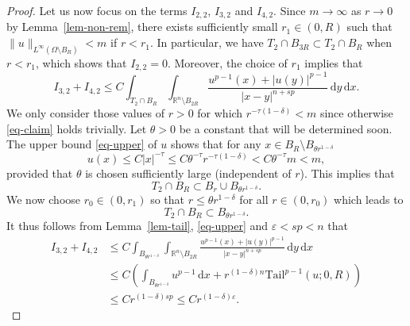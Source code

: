 \documentclass[11pt]{amsart}
\theoremstyle{plain}
\theoremstyle{definition}
\numberwithin{equation}{section}
\begin{document}
\begin{proof}
Let us now focus on the terms $I_{2, 2}$, $I_{3, 2}$ and $I_{4, 2}$. Since $m \to \infty$ as $r \to 0$ by Lemma~\ref{lem-non-rem}, there exists sufficiently small $r_1 \in (0, R)$ such that $\|u\|_{L^\infty(\Omega \setminus B_{R})} <m$ if $r<r_1$. In particular, we have $T_2 \cap B_{3R} \subset T_2 \cap B_{R}$ when $r <r_1$, which shows that $I_{2, 2}=0$. Moreover, the choice of $r_1$ implies that
\begin{equation*}
I_{3, 2} + I_{4, 2} \leq C\int_{T_2 \cap B_{R}} \int_{\mathbb{R}^n \setminus B_{2R}} \frac{u^{p-1}(x)+|u(y)|^{p-1}}{|x-y|^{n+sp}}\,\mathrm{d}y\,\mathrm{d}x.
\end{equation*}
We only consider those values of $r>0$ for which $r^{-\tau(1-\delta)}<m$ since otherwise \eqref{eq-claim} holds trivially. Let $\theta>0$ be a constant that will be determined soon. The upper bound \eqref{eq-upper} of $u$ shows that for any $x \in B_{R} \setminus B_{\theta r^{1-\delta}}$
	\begin{equation*}
		u(x) \leq C|x|^{-\tau} \leq C \theta^{-\tau} r^{-\tau(1-\delta)} <C\theta^{-\tau}m<m,
	\end{equation*}
	provided that $\theta$ is chosen sufficiently large (independent of $r$). This implies that
	\begin{equation*}
		T_2 \cap B_{R} \subset B_r \cup B_{\theta r^{1-\delta}}.
	\end{equation*}
We now choose $r_0 \in (0, r_1)$ so that $r \leq \theta r^{1-\delta}$ for all $r \in (0, r_0)$ which leads to
	\begin{equation*}
		T_2 \cap B_{R} \subset B_{\theta r^{1-\delta}}.
	\end{equation*}
It thus follows from Lemma~\ref{lem-tail}, \eqref{eq-upper} and $\varepsilon<sp<n$ that
\begin{align*}
I_{3, 2} + I_{4, 2}
&\leq C\int_{B_{\theta r^{1-\delta}}} \int_{\mathbb{R}^n \setminus B_{2R}} \frac{u^{p-1}(x)+|u(y)|^{p-1}}{|x-y|^{n+sp}}\,\mathrm{d}y\,\mathrm{d}x \\
&\leq C \left( \int_{B_{\theta r^{1-\delta}}} u^{p-1} \,\mathrm{d}x + r^{(1-\delta)n} \mathrm{Tail}^{p-1}(u; 0, R) \right) \\
&\leq C r^{(1-\delta) sp} \leq C r^{(1-\delta) \varepsilon}.
\end{align*}


\end{proof}
\end{document}
